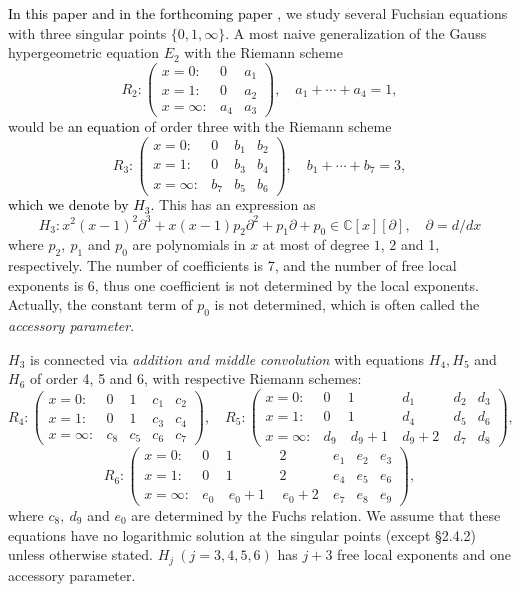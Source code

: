 \documentclass[a4paper,12pt]{article}
\theoremstyle{definition}
\theoremstyle{remark}
\numberwithin{equation}{section} %
\newcommand{\blue}[1]{\textcolor{black}{#1}}
\newcommand{\red}[1]{\textcolor{black}{#1}}
\begin{document}
\red{In this paper and in the forthcoming paper \cite{HOSY2},}
we study several Fuchsian equations with three singular points $\{0,1,\infty\}$.
A most naive generalization of the Gauss hypergeometric equation $E_2$ with the Riemann scheme
$$    R_2:\left( \begin{array}{ccc}
    x=0:&0&a_1\\
    x=1:&0&a_2\\
    x=\infty:&a_4&a_3\end{array}\right),\quad a_1+\cdots+a_4=1,$$
    would be \blue{an equation} of order three with the Riemann scheme
$$    R_3:\left( \begin{array}{cccc}
    x=0:&0&b_1&b_2\\
    x=1:&0&b_3&b_4\\
    x=\infty:&b_7&b_5&b_6\end{array}\right),\quad b_1+\cdots+b_7=3,$$
\blue{which we denote by $H_3$.}    This has an expression as
$$H_3:x^2(x-1)^2\partial^3+x(x-1)p_2\partial^2+p_1\partial+p_0\in\mathbb{C}[x][\partial],\quad \partial=d/dx$$
where $p_2,\ p_1$ and $p_0$ are polynomials in $x$ at most of degree $1$, $2$ and 1, respectively.
The number of coefficients is 7, and the number of free local exponents is 6, thus one coefficient is not determined by the local exponents. Actually, the constant term of $p_0$ is not determined, which is often called the {\it accessory parameter}.
  
$H_3$ is connected via {\it addition and middle convolution}
 with equations $H_4,H_5$ and $H_6$ of order 4, 5 and 6, with respective Riemann schemes: 
$$R_4:\left( \begin{array}{ccccc}
  x=0:& 0&1&c_1&c_2\\
  x=1:& 0&1&c_3&c_4\\
  x=\infty:& c_8&c_5&c_6&c_7\end{array}\right), \quad
R_5:\left( \begin{array}{cccccc}
 x=0:&  0&1&d_1&d_2&d_3\\
 x=1:&  0&1&d_4&d_5&d_6\\
 x=\infty:&  d_9&\ d_9+1\ &d_9+2\ &d_7&d_8\end{array}\right), $$$$
R_6:\left( \begin{array}{ccccccc}
 x=0:&  0&1&2&e_1&e_2&e_3\\
 x=1:&  0&1&2&e_4&e_5&e_6\\
 x=\infty:&  e_0&\ e_0+1\ &\ e_0+2\ &e_7&e_8&e_9\end{array}\right),$$
 where $c_8,\ d_9$ and $e_0$ are determined by the Fuchs relation. We assume that these equations have no logarithmic solution at the singular points (except \S 2.4.2) unless otherwise stated.
   $H_j\ (j=3,4,5,6)$ has $j+3$ free local exponents and one accessory parameter.
\end{document}
